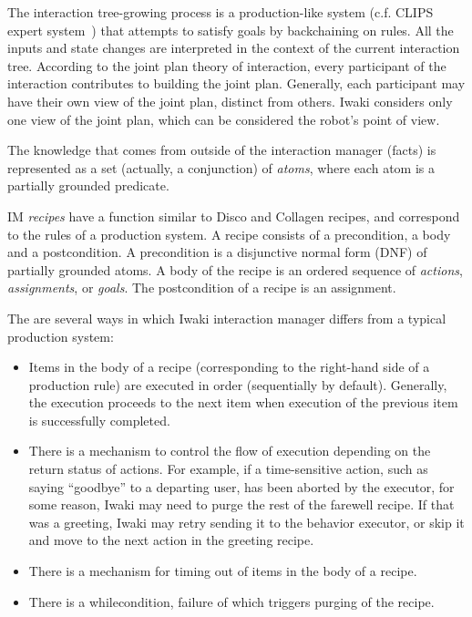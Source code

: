 The interaction tree-growing process is a production-like system (c.f. CLIPS expert system~\citep{CLIPS}) that attempts to satisfy goals by backchaining on rules.  All the inputs and state changes are interpreted in the context of the current interaction tree. According to the joint plan theory of interaction, every participant of the interaction contributes to building the joint plan. Generally, each participant may have their own view of the joint plan, distinct from others. Iwaki considers only one view of the joint plan, which can be considered the robot's point of view.

The knowledge that comes from outside of the interaction manager (facts) is represented as a set (actually, a conjunction) of \textsl{atoms}, where each atom is a partially grounded predicate. 

IM \textsl{recipes} have a function similar to Disco and Collagen recipes, and correspond to the rules of a production system. A recipe consists of a precondition, a body and a postcondition. A precondition is a disjunctive normal form (DNF) of partially grounded atoms. A body of the recipe is an ordered sequence of \textsl{actions}, \textsl{assignments}, or \textsl{goals}. The postcondition of a recipe is an assignment.


The are several ways in which Iwaki interaction manager differs from a typical production system:

\begin{itemize}    
\item Items in the body of a recipe (corresponding to the right-hand side of a production rule) are executed in order (sequentially by default). Generally, the execution proceeds to the next item when execution of the previous item is successfully completed.
\item There is a mechanism to control the flow of execution depending on the return status of actions. For example, if a time-sensitive action, such as saying ``goodbye'' to a departing user, has been aborted by the executor, for some reason, Iwaki may need to purge the rest of the farewell recipe. If that was a greeting, Iwaki may retry sending it to the behavior executor, or skip it and move to the next action in the greeting recipe.
\item There is a mechanism for timing out of items in the body of a recipe.
\item There is a whilecondition, failure of which triggers purging of the recipe.
\end{itemize}

